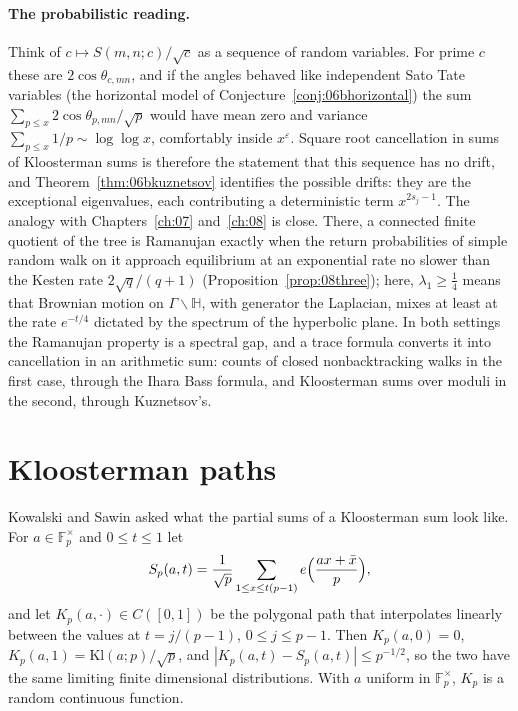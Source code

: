 \paragraph{The probabilistic reading.} Think of $c\mapsto S(m,n;c)/\sqrt c$ as a sequence of random variables. For prime $c$ these are $2\cos\theta_{c,mn}$, and if the angles behaved like independent Sato Tate variables (the horizontal model of Conjecture~\ref{conj:06bhorizontal}) the sum $\sum_{p\le x}2\cos\theta_{p,mn}/\sqrt p$ would have mean zero and variance $\sum_{p\le x}1/p\sim\log\log x$, comfortably inside $x^\varepsilon$. Square root cancellation in sums of Kloosterman sums is therefore the statement that this sequence has no drift, and Theorem~\ref{thm:06bkuznetsov} identifies the possible drifts: they are the exceptional eigenvalues, each contributing a deterministic term $x^{2s_j-1}$. The analogy with Chapters~\ref{ch:07} and~\ref{ch:08} is close. There, a connected finite quotient of the tree is Ramanujan exactly when the return probabilities of simple random walk on it approach equilibrium at an exponential rate no slower than the Kesten rate $2\sqrt q/(q+1)$ (Proposition~\ref{prop:08three}); here, $\lambda_1\ge\frac14$ means that Brownian motion on $\Gamma\backslash\mathbb{H}$, with generator the Laplacian, mixes at least at the rate $e^{-t/4}$ dictated by the spectrum of the hyperbolic plane. In both settings the Ramanujan property is a spectral gap, and a trace formula converts it into cancellation in an arithmetic sum: counts of closed nonbacktracking walks in the first case, through the Ihara Bass formula, and Kloosterman sums over moduli in the second, through Kuznetsov's.

\section{Kloosterman paths}\label{sec:06bpaths}

Kowalski and Sawin \cite{kowalskisawin2016} asked what the partial sums of a Kloosterman sum look like. For $a\in\mathbb{F}_p^\times$ and $0\le t\le1$ let
\[
S_p(a,t)=\frac{1}{\sqrt p}\sum_{1\le x\le t(p-1)}e\Bigl(\frac{ax+\bar x}{p}\Bigr),
\]
and let $K_p(a,\cdot)\in C([0,1])$ be the polygonal path that interpolates linearly between the values at $t=j/(p-1)$, $0\le j\le p-1$. Then $K_p(a,0)=0$, $K_p(a,1)=\mathrm{Kl}(a;p)/\sqrt p$, and $|K_p(a,t)-S_p(a,t)|\le p^{-1/2}$, so the two have the same limiting finite dimensional distributions. With $a$ uniform in $\mathbb{F}_p^\times$, $K_p$ is a random continuous function.

